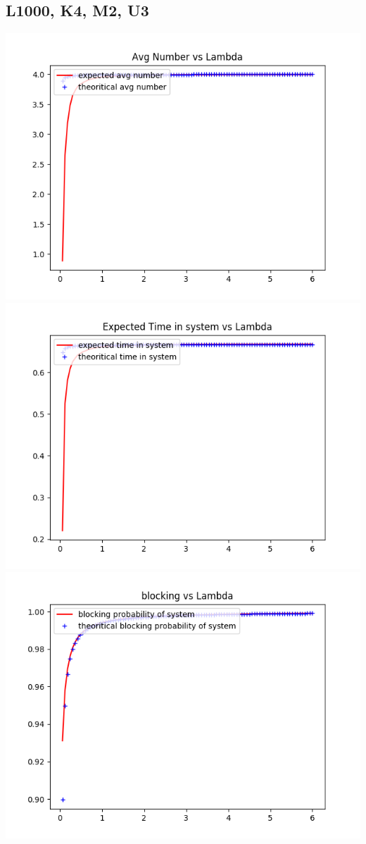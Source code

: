 \documentclass[11pt]{article}
\begin{document}
 \subsection{L1000, K4, M2, U3}
 \includegraphics{ExpectedNumber_L1000_K4_M2_U3}
  \includegraphics{ExpectedTime_L1000_K4_M2_U3}
 \includegraphics{BlockingProbability_L1000_K4_M2_U3}
\end{document}

